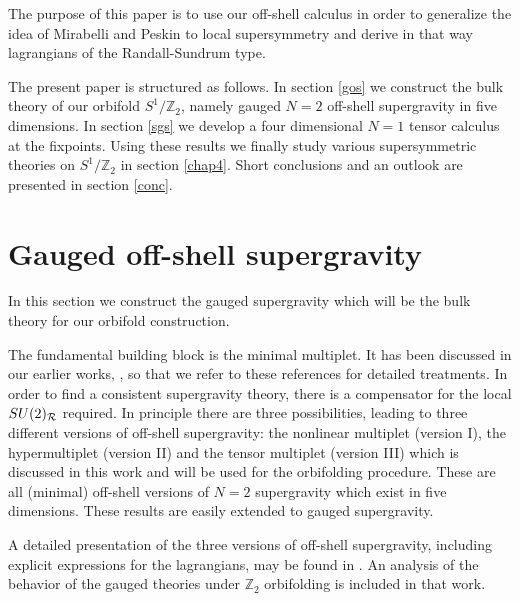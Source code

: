 \documentclass[a4paper,12pt, twoside]{article}
\numberwithin{equation}{section}
\begin{document}
The purpose of this paper is to use our off-shell calculus in order to 
generalize the idea of Mirabelli and Peskin to local supersymmetry and 
derive in that way lagrangians of the Randall-Sundrum type.

\medskip

The present paper is structured as follows. In section \ref{gos} we 
construct the bulk theory of our orbifold $S^1/\mathbb{Z}_2$, namely 
gauged $N=2$ off-shell supergravity in five dimensions.
In section \ref{sgs} we develop a four dimensional $N=1$ tensor 
calculus at the fixpoints. Using these results we finally study various 
supersymmetric theories on $S^1/\mathbb{Z}_2$ in section \ref{chap4}. Short 
conclusions and an outlook are presented in section \ref{conc}.

\section{Gauged off-shell supergravity\label{gos}}
In this section we construct the gauged supergravity which will be the 
bulk theory for our orbifold construction. 

The fundamental building block is the minimal multiplet. It has been 
discussed in our earlier works, \cite{Zucker:2000ej, Zucker:1999fn}, so 
that we refer to these references for detailed treatments. In order to 
find a consistent supergravity theory, there is a compensator for the 
local $SU(2)_{\cal R}$ required. In principle there are three 
possibilities, leading to three different versions of off-shell supergravity: the 
nonlinear multiplet \cite{Zucker:2000ej} (version I), the 
hypermultiplet \cite{diss} (version II) and the tensor multiplet (version III) which 
is discussed in this work and will be used for the orbifolding 
procedure. These are all (minimal) off-shell versions of $N=2$ supergravity 
which exist in five dimensions. These results are easily extended to 
gauged supergravity. 

A detailed presentation of the three versions of off-shell 
supergravity, including explicit expressions for the lagrangians, may be found in 
\cite{diss}. An analysis of the behavior of the gauged theories under 
$\mathbb{Z}_2$ orbifolding is included in that work. 
\end{document}
